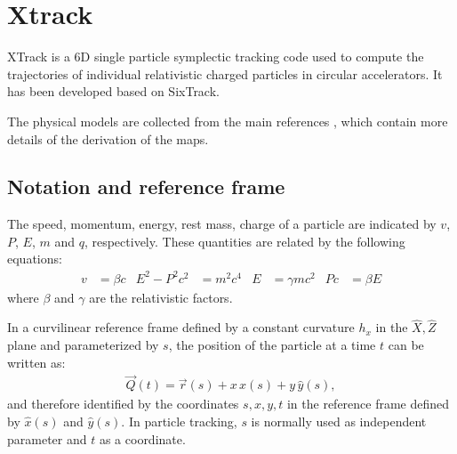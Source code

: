 \chapter{Xtrack}

XTrack is a 6D single particle symplectic tracking code used to compute the
trajectories of individual relativistic charged particles in circular
accelerators. It has been developed based on SixTrack.

The physical models are collected from the main references
\cite{ripken85,barber87,ripken95,heinemann95,barber96,beam_beam,rf_multipoles},
which contain more details of the derivation of the maps.


\section{Notation and reference frame}

The speed, momentum, energy, rest mass, charge of a particle are indicated
by $v$, $P$, $E$, $m$ and $q$, respectively.  These quantities are
related by the following equations:
\begin{align}
  v&=\beta c &
  E^2-P^2c^2&=m^2c^4 &
  E & = \gamma mc^2 &
  Pc & =\beta E
\end{align}
where $\beta$ and $\gamma$ are the relativistic factors.

In a curvilinear reference frame defined by a constant curvature $h_x$ in the
$\hat X, \hat Z$ plane and parameterized by $s$, the
position of the particle at a time $t$ can be written as:
\begin{align}
  \vec Q(t)= \vec r(s) + x \,\hat x(s) + y\, \hat y(s),
\end{align}
and therefore identified by the coordinates $s, x, y, t$ in the reference frame
defined by $\hat x(s)$ and $\hat y(s)$. In particle tracking, $s$ is normally
used as independent parameter and $t$ as a coordinate.

